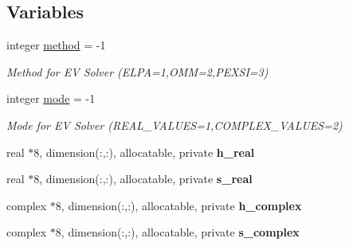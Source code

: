 \subsection*{Variables}
\begin{DoxyCompactItemize}
\item 
\hypertarget{namespaceelsi_abb4e04a2d624f8d169abb6dd55f8510c}{}integer \hyperlink{namespaceelsi_abb4e04a2d624f8d169abb6dd55f8510c}{method} = -\/1\label{namespaceelsi_abb4e04a2d624f8d169abb6dd55f8510c}

\begin{DoxyCompactList}\small\item\em Method for E\+V Solver (E\+L\+P\+A=1,O\+M\+M=2,P\+E\+X\+S\+I=3) \end{DoxyCompactList}\item 
\hypertarget{namespaceelsi_ac6c03b44a7776b204d99901393c46f64}{}integer \hyperlink{namespaceelsi_ac6c03b44a7776b204d99901393c46f64}{mode} = -\/1\label{namespaceelsi_ac6c03b44a7776b204d99901393c46f64}

\begin{DoxyCompactList}\small\item\em Mode for E\+V Solver (R\+E\+A\+L\+\_\+\+V\+A\+L\+U\+E\+S=1,C\+O\+M\+P\+L\+E\+X\+\_\+\+V\+A\+L\+U\+E\+S=2) \end{DoxyCompactList}\item 
\hypertarget{namespaceelsi_ae7f6e8de89d8a7563dcd8e9c3492ab57}{}real $\ast$8, dimension(\+:,\+:), allocatable, private {\bfseries h\+\_\+real}\label{namespaceelsi_ae7f6e8de89d8a7563dcd8e9c3492ab57}

\item 
\hypertarget{namespaceelsi_a6a921d47148bdf7549400007bac12164}{}real $\ast$8, dimension(\+:,\+:), allocatable, private {\bfseries s\+\_\+real}\label{namespaceelsi_a6a921d47148bdf7549400007bac12164}

\item 
\hypertarget{namespaceelsi_afa23fd2866f336d9a872d3b62d7f579c}{}complex $\ast$8, dimension(\+:,\+:), allocatable, private {\bfseries h\+\_\+complex}\label{namespaceelsi_afa23fd2866f336d9a872d3b62d7f579c}

\item 
\hypertarget{namespaceelsi_a5b82ddfa83983c38a879b2854ec93951}{}complex $\ast$8, dimension(\+:,\+:), allocatable, private {\bfseries s\+\_\+complex}\label{namespaceelsi_a5b82ddfa83983c38a879b2854ec93951}

\end{DoxyCompactItemize}


